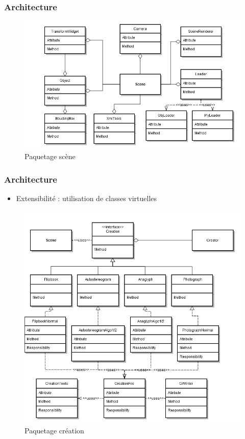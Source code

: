 \documentclass{beamer}
\begin{document}
\begin{frame}
\frametitle{Architecture}
\centering
\begin{figure}
  \includegraphics[scale=0.4]{scene.png}
  \caption{Paquetage scène}
\end{figure}
\end{frame}

% 

\begin{frame}
\frametitle{Architecture}
\begin{itemize}[label=$\bullet$]
\item Extensibilité : utilisation de classes virtuelles
\end{itemize}
\centering
\begin{figure}
  \includegraphics[scale=0.25]{extensibilite.png}
  \caption{Paquetage création}
\end{figure}
\end{frame}
\end{document}
